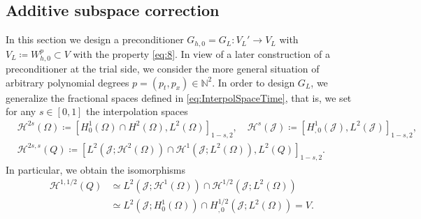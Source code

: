 \documentclass{amsart}
\newcommand{\cH}{\mathcal H}
\newcommand{\cJ}{\mathcal J}
\begin{document}
\subsection{Additive subspace correction}\label{subsec:AddSubspaceCorr}
In this section we design a preconditioner $G_{h,0}= G_L\colon V_L'\to V_L$ with $V_L \coloneqq W_{h,0}^p \subset V$ with the property \eqref{eq:8}. 
In view of a later construction of a preconditioner at the trial side, we consider the more general situation of arbitrary polynomial degrees $p = (p_t,p_x)\in \mathbb{N}^2$. 
In order to design $G_L$, we generalize the fractional spaces defined in \eqref{eq:InterpolSpaceTime}, that is, we set for any $s \in [0,1]$ the interpolation spaces
\begin{align*}
&\cH^{2s}(\Omega)\coloneqq [H^1_0(\Omega) \cap H^2(\Omega),L^2(\Omega)]_{1-s,2},\quad
\cH^s(\cJ)\coloneqq [H^1_{,0}(\cJ),L^2(\cJ)]_{1-s,2},\\
&\cH^{2s,s}(Q)\coloneqq [L^2(\cJ;\cH^2(\Omega)) \cap \cH^1(\cJ;L^2(\Omega)),L^2(Q)]_{1-s,2}.
\end{align*}
In particular, we obtain the isomorphisms
\begin{align*}
\cH^{1,1/2}(Q)& \simeq L^2(\cJ;\cH^{1}(\Omega)) \cap \cH^{1/2}(\cJ;L^2(\Omega))\\
& \simeq L^2(\cJ;H^1_0(\Omega)) \cap H^{1/2}_{,0}(\cJ;L^2(\Omega)) = V.
\end{align*}
\end{document}
